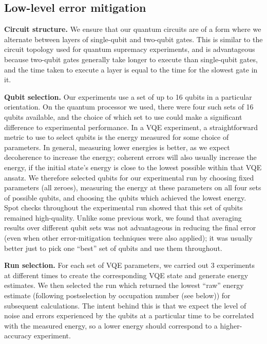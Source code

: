 \documentclass[aps,prb,twoside,superscriptaddress,longbibliography,nofootinbib,floatfix, notitlepage,twocolumn]{revtex4-1}
\begin{document}

\subsection{Low-level error mitigation}

\textbf{Circuit structure.} We ensure that our quantum circuits are of a form where we alternate between layers of single-qubit and two-qubit gates. This is similar to the circuit topology used for quantum supremacy experiments\cite{sycamore}, and is advantageous because two-qubit gates generally take longer to execute than single-qubit gates, and the time taken to execute a layer is equal to the time for the slowest gate in it.

\textbf{Qubit selection.} Our experiments use a set of up to 16 qubits in a particular orientation. On the quantum processor we used, there were four such sets of 16 qubits available, and the choice of which set to use could make a significant difference to experimental performance. In a VQE experiment, a straightforward metric to use to select qubits is the energy measured for some choice of parameters. In general, measuring lower energies is better, as we expect decoherence to increase the energy; coherent errors will also usually increase the energy, if the initial state's energy is close to the lowest possible within that VQE ansatz. We therefore selected qubits for our experimental run by choosing fixed parameters (all zeroes), measuring the energy at these parameters on all four sets of possible qubits, and choosing the qubits which achieved the lowest energy. Spot checks throughout the experimental run showed that this set of qubits remained high-quality. Unlike some previous work\cite{GoogleFH_TDS_2020}, we found that averaging results over different qubit sets was not advantageous in reducing the final error (even when other error-mitigation techniques were also applied); it was usually better just to pick one ``best'' set of qubits and use them throughout.

\textbf{Run selection.} For each set of VQE parameters, we carried out 3 experiments at different times to create the corresponding VQE state and generate energy estimates. We then selected the run which returned the lowest ``raw'' energy estimate (following postselection by occupation number (see below)) for subsequent calculations. The intent behind this is that we expect the level of noise and errors experienced by the qubits at a particular time to be correlated with the measured energy, so a lower energy should correspond to a higher-accuracy experiment.
\end{document}
